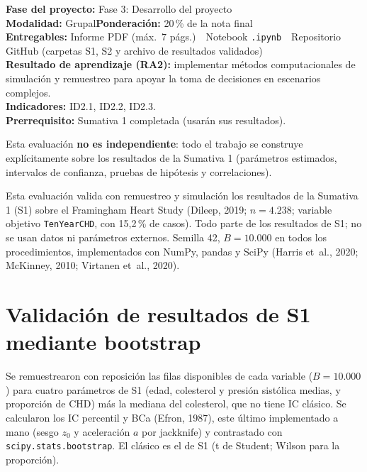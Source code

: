 \documentclass[11pt,a4paper]{article}
\begin{document}
\clearpage
{}
\begin{infobox}
\textbf{Fase del proyecto:} Fase 3: Desarrollo del proyecto\\
\textbf{Modalidad:} Grupal\qquad\textbf{Ponderación:} 20\,\% de la nota final\\
\textbf{Entregables:} Informe PDF (máx.\ 7 págs.)\ \textperiodcentered\ Notebook \texttt{.ipynb}\ \textperiodcentered\ Repositorio GitHub (carpetas S1, S2 y archivo de resultados validados)\\
\textbf{Resultado de aprendizaje (RA2):} implementar métodos computacionales de simulación y remuestreo para apoyar la toma de decisiones en escenarios complejos.\\
\textbf{Indicadores:} ID2.1, ID2.2, ID2.3.\\
\textbf{Prerrequisito:} Sumativa 1 completada (usarán sus resultados).
\end{infobox}
\begin{conexionbox}
Esta evaluación \textbf{no es independiente}: todo el trabajo se construye explícitamente sobre los resultados de la Sumativa 1 (parámetros estimados, intervalos de confianza, pruebas de hipótesis y correlaciones).
\end{conexionbox}

\vspace{0.1em}
\tableofcontents

\noindent Esta evaluación valida con remuestreo y simulación los resultados de la Sumativa 1 (S1) sobre el Framingham Heart Study (Dileep, 2019; $n=4.238$; variable objetivo \texttt{TenYearCHD}, con 15,2\,\% de casos). Todo parte de los resultados de S1; no se usan datos ni parámetros externos. Semilla 42, $B=10.000$ en todos los procedimientos, implementados con NumPy, pandas y SciPy (Harris et~al., 2020; McKinney, 2010; Virtanen et~al., 2020).

\section{Validación de resultados de S1 mediante bootstrap}

Se remuestrearon con reposición las filas disponibles de cada variable ($B=10.000$) para cuatro parámetros de S1 (edad, colesterol y presión sistólica medias, y proporción de CHD) más la mediana del colesterol, que no tiene IC clásico. Se calcularon los IC percentil y BCa (Efron, 1987), este último implementado a mano (sesgo $z_0$ y aceleración $a$ por jackknife) y contrastado con \texttt{scipy.stats.bootstrap}. El clásico es el de S1 (t de Student; Wilson para la proporción).
\end{document}

